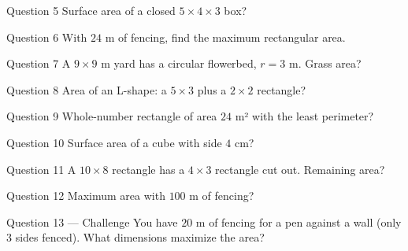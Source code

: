 \documentclass[11pt]{article}
\begin{document}
\begin{qbox}{Question 5}
Surface area of a closed $5\times4\times3$ box?\workspace{2.4cm}
\end{qbox}

\begin{qbox}{Question 6}
With $24$ m of fencing, find the maximum rectangular area.\workspace{2.4cm}
\end{qbox}

\begin{qbox}{Question 7}
A $9\times9$ m yard has a circular flowerbed, $r=3$ m. Grass area?\workspace{2.4cm}
\end{qbox}

\begin{qbox}{Question 8}
Area of an L-shape: a $5\times3$ plus a $2\times2$ rectangle?\workspace{2.4cm}
\end{qbox}

\begin{qbox}{Question 9}
Whole-number rectangle of area $24$ m² with the least perimeter?\workspace{2.4cm}
\end{qbox}

\begin{qbox}{Question 10}
Surface area of a cube with side $4$ cm?\workspace{2.4cm}
\end{qbox}

\begin{qbox}{Question 11}
A $10\times8$ rectangle has a $4\times3$ rectangle cut out. Remaining area?\workspace{2.4cm}
\end{qbox}

\begin{qbox}{Question 12}
Maximum area with $100$ m of fencing?\workspace{2.4cm}
\end{qbox}

\begin{qbox}{Question 13 --- Challenge}
You have $20$ m of fencing for a pen against a wall (only 3 sides fenced). What dimensions maximize the area?\workspace{3.5cm}
\end{qbox}

\clearpage
{}
\end{document}
